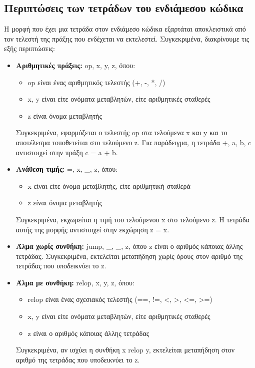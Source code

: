 \documentclass[12pt,a4paper]{article}
\begin{document}
\subsection{Περιπτώσεις των τετράδων του ενδιάμεσου κώδικα}
Η μορφή που έχει μια τετράδα στον ενδιάμεσο κώδικα εξαρτάται αποκλειστικά από τον τελεστή της πράξης που ενδέχεται να εκτελεστεί. Συγκεκριμένα, διακρίνουμε τις εξής περιπτώσεις:
\begin{itemize}
    \item \textbf{Αριθμητικές πράξεις:} op, x, y, z, όπου:
    \begin{itemize}
        \item op είναι ένας αριθμητικός τελεστής (+, -, *, /)
        \item x, y είναι είτε ονόματα μεταβλητών, είτε αριθμητικές σταθερές
        \item z είναι όνομα μεταβλητής
    \end{itemize}
    Συγκεκριμένα, εφαρμόζεται ο τελεστής op στα τελούμενα x και y και το αποτέλεσμα τοποθετείται στο τελούμενο z. Για παράδειγμα, η τετράδα +, a, b, c αντιστοιχεί στην πράξη c = a + b.

    \item \textbf{Ανάθεση τιμής:} =, x, \_, z, όπου:
    \begin{itemize}
        \item x είναι είτε όνομα μεταβλητής, είτε αριθμητική σταθερά
        \item z είναι όνομα μεταβλητής
    \end{itemize}
    Συγκεκριμένα, εκχωρείται η τιμή του τελούμενου x στο τελούμενο z. Η τετράδα αυτής της μορφής αντιστοιχεί στην εκχώρηση z = x.

    \item \textbf{Άλμα χωρίς συνθήκη:} jump, \_, \_, z, όπου z είναι ο αριθμός κάποιας άλλης τετράδας. Συγκεκριμένα, εκτελείται μεταπήδηση χωρίς όρους στον αριθμό της τετράδας που υποδεικνύει το z.

    \item \textbf{Άλμα με συνθήκη:} relop, x, y, z, όπου:
    \begin{itemize}
        \item relop είναι ένας σχεσιακός τελεστής (==, !=, <, >, <=, >=)
        \item x, y είναι είτε ονόματα μεταβλητών, είτε αριθμητικές σταθερές
        \item z είναι ο αριθμός κάποιας άλλης τετράδας
    \end{itemize}
    Συγκεκριμένα, αν ισχύει η συνθήκη x relop y, εκτελείται μεταπήδηση στον αριθμό της τετράδας που υποδεικνύει το z.


\end{itemize}
\end{document}
